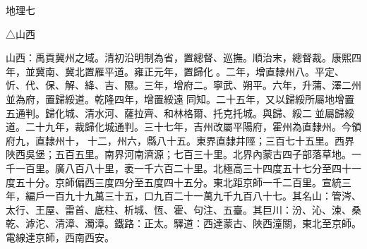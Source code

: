 
\begin{pinyinscope}
地理七

△山西

山西：禹貢冀州之域。清初沿明制為省，置總督、巡撫。順治末，總督裁。康熙四年，並冀南、冀北置雁平道。雍正元年，置歸化。二年，增直隸州八。平定、忻、代、保、解、絳、吉、隰。三年，增府二。寧武、朔平。六年，升蒲、澤二州並為府，置歸綏道。乾隆四年，增置綏遠同知。二十五年，又以歸綏所屬地增置五通判。歸化城、清水河、薩拉齊、和林格爾、托克托城。與歸、綏二並屬歸綏道。二十九年，裁歸化城通判。三十七年，吉州改屬平陽府，霍州為直隸州。今領府九，直隸州十，十二，州六，縣八十五。東界直隸井陘；三百七十五里。西界陜西吳堡；五百五里。南界河南濟源；七百三十里。北界內蒙古四子部落草地。一千一百里。廣八百八十里，袤一千六百二十里。北極高三十四度五十七分至四十一度五十分。京師偏西三度四分至五度四十五分。東北距京師一千二百里。宣統三年，編戶一百九十九萬三十五，口九百二十一萬九千九百八十七。其名山：管涔、太行、王屋、雷首、底柱、析城、恆、霍、句注、五臺。其巨川：汾、沁、涑、桑乾、滹沱、清漳、濁漳。鐵路：正太。驛道：西達蒙古、陜西潼關，東北至京師。電線達京師，西南西安。


\end{pinyinscope}

